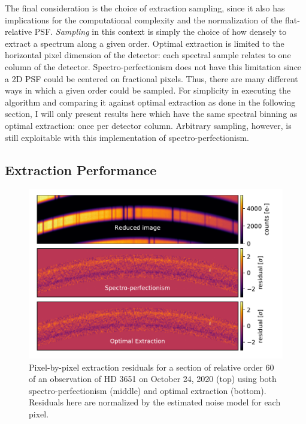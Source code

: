 The final consideration is the choice of extraction sampling, since it also has implications for the computational complexity and the normalization of the flat-relative PSF. \textit{Sampling} in this context is simply the choice of how densely to extract a spectrum along a given order. Optimal extraction is limited to the horizontal pixel dimension of the detector: each spectral sample relates to one column of the detector. Spectro-perfectionism does not have this limitation since a 2D PSF could be centered on fractional pixels. Thus, there are many different ways in which a given order could be sampled. For simplicity in executing the algorithm and comparing it against optimal extraction as done in the following section, I will only present results here which have the same spectral binning as optimal extraction: once per detector column. Arbitrary sampling, however, is still exploitable with this implementation of spectro-perfectionism.

\subsection{Extraction Performance} \label{pipeline2:spec-perf:performance}

\begin{figure}
    \centering
    \includegraphics[width=\textwidth]{figures-5/extraction-residuals.pdf}
    \caption[Spectro-perfectionism pixel-wise extraction residuals]{Pixel-by-pixel extraction residuals for a section of relative order 60 of an observation of HD 3651 on October 24, 2020 (top) using both spectro-perfectionism (middle) and optimal extraction (bottom). Residuals here are normalized by the estimated noise model for each pixel.}
    \label{fig:extraction-residuals}
\end{figure}

